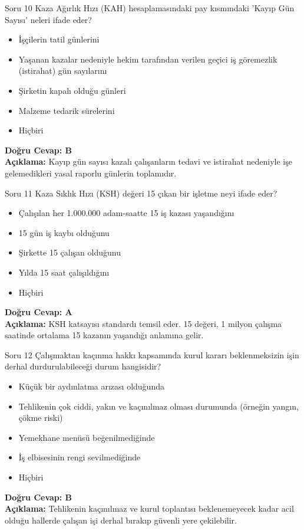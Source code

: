 \documentclass[12pt,a4paper]{article}
\begin{document}
\begin{testcard}{Soru 10}
    Kaza Ağırlık Hızı (KAH) hesaplamasındaki pay kısmındaki 'Kayıp Gün Sayısı' neleri ifade eder?
    \begin{itemize}
        \item[A)] İşçilerin tatil günlerini
        \item[B)] Yaşanan kazalar nedeniyle hekim tarafından verilen geçici iş göremezlik (istirahat) gün sayılarını
        \item[C)] Şirketin kapalı olduğu günleri
        \item[D)] Malzeme tedarik sürelerini
        \item[E)] Hiçbiri
    \end{itemize}
    \tcblower
    \textbf{Doğru Cevap: B} \\
    \textbf{Açıklama:} Kayıp gün sayısı kazalı çalışanların tedavi ve istirahat nedeniyle işe gelemedikleri yasal raporlu günlerin toplamıdır.
\end{testcard}

\begin{testcard}{Soru 11}
    Kaza Sıklık Hızı (KSH) değeri 15 çıkan bir işletme neyi ifade eder?
    \begin{itemize}
        \item[A)] Çalışılan her 1.000.000 adam-saatte 15 iş kazası yaşandığını
        \item[B)] 15 gün iş kaybı olduğunu
        \item[C)] Şirkette 15 çalışan olduğunu
        \item[D)] Yılda 15 saat çalışıldığını
        \item[E)] Hiçbiri
    \end{itemize}
    \tcblower
    \textbf{Doğru Cevap: A} \\
    \textbf{Açıklama:} KSH katsayısı standardı temsil eder. 15 değeri, 1 milyon çalışma saatinde ortalama 15 kazanın yaşandığı anlamına gelir.
\end{testcard}

\begin{testcard}{Soru 12}
    Çalışmaktan kaçınma hakkı kapsamında kurul kararı beklenmeksizin işin derhal durdurulabileceği durum hangisidir?
    \begin{itemize}
        \item[A)] Küçük bir aydınlatma arızası olduğunda
        \item[B)] Tehlikenin çok ciddi, yakın ve kaçınılmaz olması durumunda (örneğin yangın, çökme riski)
        \item[C)] Yemekhane menüsü beğenilmediğinde
        \item[D)] İş elbisesinin rengi sevilmediğinde
        \item[E)] Hiçbiri
    \end{itemize}
    \tcblower
    \textbf{Doğru Cevap: B} \\
    \textbf{Açıklama:} Tehlikenin kaçınılmaz ve kurul toplantısı beklenemeyecek kadar acil olduğu hallerde çalışan işi derhal bırakıp güvenli yere çekilebilir.
\end{testcard}
\end{document}
